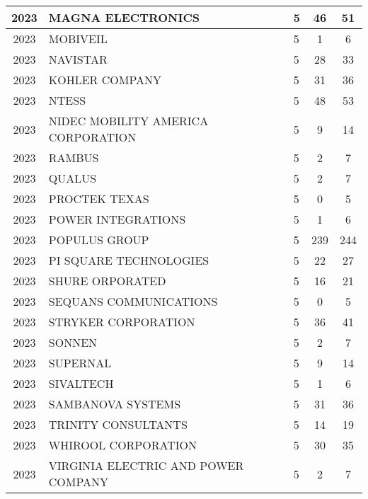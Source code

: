 \documentclass{article}%
\begin{document}
\begin{longtable}{c|p{20em}|p{5em}|c|c}
\hline%
2023&MAGNA ELECTRONICS&5&46&51\\%
\hline%
2023&MOBIVEIL&5&1&6\\%
\hline%
2023&NAVISTAR&5&28&33\\%
\hline%
2023&KOHLER COMPANY&5&31&36\\%
\hline%
2023&NTESS&5&48&53\\%
\hline%
2023&NIDEC MOBILITY AMERICA CORPORATION&5&9&14\\%
\hline%
2023&RAMBUS&5&2&7\\%
\hline%
2023&QUALUS&5&2&7\\%
\hline%
2023&PROCTEK TEXAS&5&0&5\\%
\hline%
2023&POWER INTEGRATIONS&5&1&6\\%
\hline%
2023&POPULUS GROUP&5&239&244\\%
\hline%
2023&PI SQUARE TECHNOLOGIES&5&22&27\\%
\hline%
2023&SHURE ORPORATED&5&16&21\\%
\hline%
2023&SEQUANS COMMUNICATIONS&5&0&5\\%
\hline%
2023&STRYKER CORPORATION&5&36&41\\%
\hline%
2023&SONNEN&5&2&7\\%
\hline%
2023&SUPERNAL&5&9&14\\%
\hline%
2023&SIVALTECH&5&1&6\\%
\hline%
2023&SAMBANOVA SYSTEMS&5&31&36\\%
\hline%
2023&TRINITY CONSULTANTS&5&14&19\\%
\hline%
2023&WHIROOL CORPORATION&5&30&35\\%
\hline%
2023&VIRGINIA ELECTRIC AND POWER COMPANY&5&2&7\\%
\hline%
\end{longtable}

%
\end{document}
